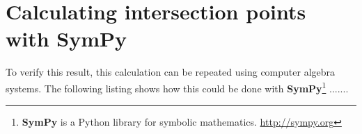 \section{Calculating intersection points with SymPy}
\label{app:calculating_intersections_with_sympy}


To verify this result, this calculation can be repeated using computer algebra systems. The following listing shows how this could be done with \textbf{SymPy}\footnote{\textbf{SymPy} is a Python library for symbolic mathematics. \url{http://sympy.org}} .......

